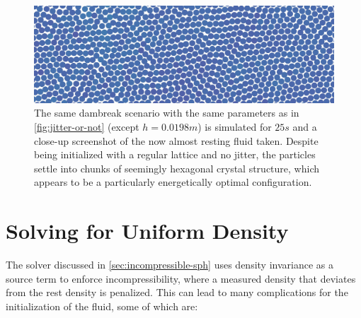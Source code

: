 \begin{figure}
  \centering
  \includegraphics*[width=\textwidth]{images/initial/natural-hex-wide.jpg}
  \caption{The same dambreak scenario with the same parameters as in \autoref{fig:jitter-or-not} (except $h=0.0198m$) is simulated for $25s$ and a close-up screenshot of the now almost resting fluid taken. Despite being initialized with a regular lattice and no jitter, the particles settle into chunks of seemingly hexagonal crystal structure, which appears to be a particularly energetically optimal configuration.}
  \label{fig:natural-hexagons}
\end{figure}




\newpage

\section{Solving for Uniform Density}\label{sec:equilibrate-density}

The solver discussed in \autoref{sec:incompressible-sph} uses density invariance as a source term to enforce incompressibility, where a measured density that deviates from the rest density is penalized. This can lead to many complications for the initialization of the fluid, some of which are:

